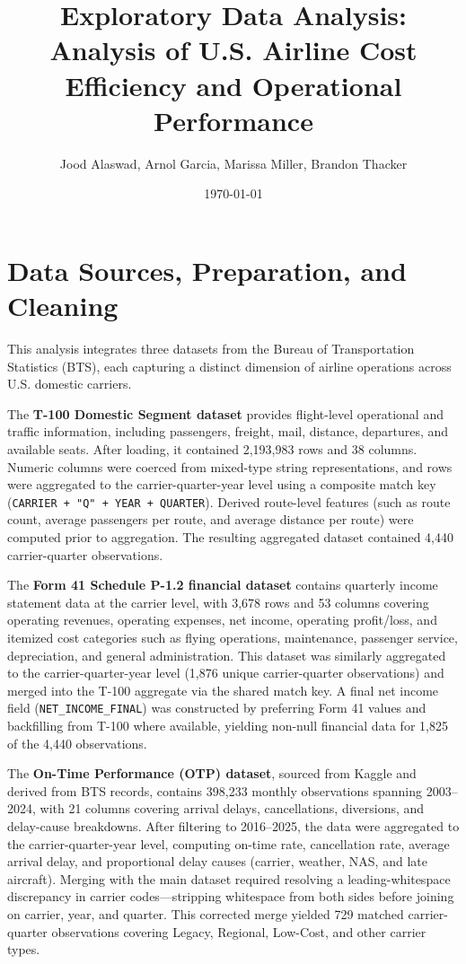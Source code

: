 \documentclass[11pt, letterpaper]{article}
\title{\textbf{Exploratory Data Analysis: \\ Analysis of U.S. Airline Cost Efficiency and Operational Performance}}
\author{Jood Alaswad, Arnol Garcia, Marissa Miller, Brandon Thacker}
\date{\today}
\begin{document}
\maketitle
\tableofcontents
\newpage

\section{Data Sources, Preparation, and Cleaning}

This analysis integrates three datasets from the Bureau of Transportation Statistics (BTS), each capturing a distinct dimension of airline operations across U.S. domestic carriers.

The \textbf{T-100 Domestic Segment dataset} provides flight-level operational and traffic information, including passengers, freight, mail, distance, departures, and available seats. After loading, it contained 2,193,983 rows and 38 columns. Numeric columns were coerced from mixed-type string representations, and rows were aggregated to the carrier-quarter-year level using a composite match key (\texttt{CARRIER + "Q" + YEAR + QUARTER}). Derived route-level features (such as route count, average passengers per route, and average distance per route) were computed prior to aggregation. The resulting aggregated dataset contained 4,440 carrier-quarter observations.

The \textbf{Form 41 Schedule P-1.2 financial dataset} contains quarterly income statement data at the carrier level, with 3,678 rows and 53 columns covering operating revenues, operating expenses, net income, operating profit/loss, and itemized cost categories such as flying operations, maintenance, passenger service, depreciation, and general administration. This dataset was similarly aggregated to the carrier-quarter-year level (1,876 unique carrier-quarter observations) and merged into the T-100 aggregate via the shared match key. A final net income field (\texttt{NET\_INCOME\_FINAL}) was constructed by preferring Form 41 values and backfilling from T-100 where available, yielding non-null financial data for 1,825 of the 4,440 observations.

The \textbf{On-Time Performance (OTP) dataset}, sourced from Kaggle and derived from BTS records, contains 398,233 monthly observations spanning 2003--2024, with 21 columns covering arrival delays, cancellations, diversions, and delay-cause breakdowns. After filtering to 2016--2025, the data were aggregated to the carrier-quarter-year level, computing on-time rate, cancellation rate, average arrival delay, and proportional delay causes (carrier, weather, NAS, and late aircraft). Merging with the main dataset required resolving a leading-whitespace discrepancy in carrier codes---stripping whitespace from both sides before joining on carrier, year, and quarter. This corrected merge yielded 729 matched carrier-quarter observations covering Legacy, Regional, Low-Cost, and other carrier types.
\end{document}
